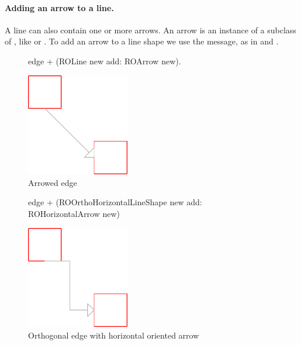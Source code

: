 \documentclass[a4paper,10pt,twoside]{book}
\begin{document}
\paragraph{Adding an arrow to a line.}
A line can also contain one or more arrows. An arrow is an instance of a subclass of , like  or . To add an arrow to a line shape we use the  message, as in  and .

\begin{figure}[H]
      \begin{minipage}[t]{0.5\textwidth}
      \vspace{0pt}
     \begin{code}{}
edge + (ROLine new add: ROArrow new). \end{code}
   \end{minipage}
   \hfill
   \begin{minipage}[t]{0.4\textwidth}
      \vspace{0pt} \raggedright
       \centering
		\includegraphics[width=0.4\textwidth]{arrowEdge}
   \end{minipage}
\caption{Arrowed edge}
\label{fig:arrowEdge}
\end{figure} 

\begin{figure}[H]
      \begin{minipage}[t]{0.5\textwidth}
      \vspace{0pt}
     \begin{code}{}
edge + (ROOrthoHorizontalLineShape new add: ROHorizontalArrow new)\end{code}
   \end{minipage}
   \hfill
   \begin{minipage}[t]{0.4\textwidth}
      \vspace{0pt} \raggedright
       \centering
		\includegraphics[width=0.4\textwidth]{orthoEdgeArrow}
   \end{minipage}
\caption{Orthogonal edge with horizontal oriented arrow}
\label{fig:orthoEdgeArrow}
\end{figure} 
\end{document}
